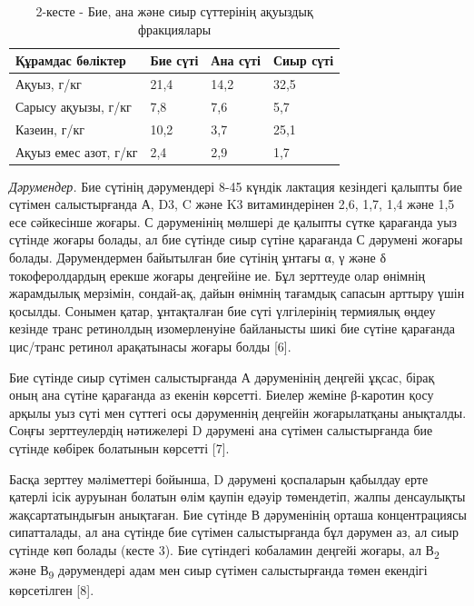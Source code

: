 \begin{table}[H]
\caption*{2-кесте - Бие, ана және сиыр сүттерінің ақуыздық фракциялары}
\centering
\begin{tabular}{|l|l|l|l|}
\hline
Құрамдас бөліктер & Бие сүті & Ана сүті & Сиыр сүті \\ \hline
Ақуыз, г/кг & 21,4 & 14,2 & 32,5 \\ \hline
Сарысу ақуызы, г/кг & 7,8 & 7,6 & 5,7 \\ \hline
Казеин, г/кг & 10,2 & 3,7 & 25,1 \\ \hline
Ақуыз емес азот, г/кг & 2,4 & 2,9 & 1,7 \\ \hline
\end{tabular}
\end{table}

\begin{multicols}{2}
\emph{Дәрумендер.} Бие сүтінің дәрумендері 8-45 күндік лактация
кезіндегі қалыпты бие сүтімен салыстырғанда А, D3, C және K3
витаминдерінен 2,6, 1,7, 1,4 және 1,5 есе сәйкесінше жоғары. С
дәруменінің мөлшері де қалыпты сүтке қарағанда уыз сүтінде жоғары
болады, ал бие сүтінде сиыр сүтіне қарағанда С дәрумені жоғары болады.
Дәрумендермен байытылған бие сүтінің ұнтағы α, γ және δ токоферолдардың
ерекше жоғары деңгейіне ие. Бұл зерттеуде олар өнімнің жарамдылық
мерзімін, сондай-ақ, дайын өнімнің тағамдық сапасын арттыру үшін
қосылды. Сонымен қатар, ұнтақталған бие сүті үлгілерінің термиялық өңдеу
кезінде транс ретинолдың изомерленуіне байланысты шикі бие сүтіне
қарағанда цис/транс ретинол арақатынасы жоғары болды {[}6{]}.

Бие сүтінде сиыр сүтімен салыстырғанда А дәруменінің деңгейі ұқсас,
бірақ оның ана сүтіне қарағанда аз екенін көрсетті. Биелер жеміне
β-каротин қосу арқылы уыз сүті мен сүттегі осы дәруменнің деңгейін
жоғарылатқаны анықталды. Соңғы зерттеулердің нәтижелері D дәрумені ана
сүтімен салыстырғанда бие сүтінде көбірек болатынын көрсетті {[}7{]}.

Басқа зерттеу мәліметтері бойынша, D дәрумені қоспаларын қабылдау ерте
қатерлі ісік ауруынан болатын өлім қаупін едәуір төмендетіп, жалпы
денсаулықты жақсартатындығын анықтаған. Бие сүтінде В дәруменінің орташа
концентрациясы сипатталады, ал ана сүтінде бие сүтімен салыстырғанда бұл
дәрумен аз, ал сиыр сүтінде көп болады (кесте 3). Бие сүтіндегі
кобаламин деңгейі жоғары, ал В\textsubscript{2} және В\textsubscript{9}
дәрумендері адам мен сиыр сүтімен салыстырғанда төмен екендігі
көрсетілген {[}8{]}.
\end{multicols}

